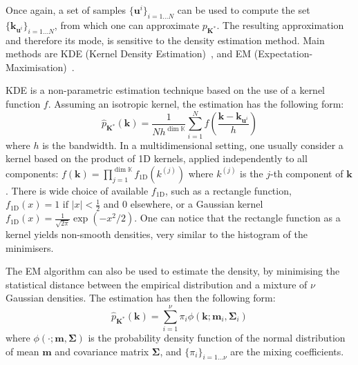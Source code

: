 \documentclass[preprint, 1p]{elsarticle}
\newcommand{\Kspace}{\mathbb{K}}
\newcommand{\elise}[1]{{\itshape\color{red} ({#1})}}
\begin{document}
Once again, a set of samples  $\{\mathbf{u}^i\}_{i=1\dots N}$ can be used to compute the set $\{\mathbf{k}_{\mathbf{u}^i}\}_{i=1\dots N}$, from which one can 
approximate  $p_{\mathbf{K}^*}$. The resulting approximation and therefore its mode, is sensitive to the density estimation method. Main methods are KDE  (Kernel Density Estimation)~\cite{elise}, and  EM (Expectation-Maximisation)~\citep{dempster_maximum_1977}.


KDE is a non-parametric estimation technique based on the use of a kernel function $f$. Assuming an isotropic kernel, the estimation has the following form:
\begin{equation}
\hat{p}_{\mathbf{K}^*}(\mathbf{k}) = \frac{1}{Nh^{\dim \Kspace}} \sum_{i=1}^N f\left(\frac{\mathbf{k} - \mathbf{k}_{\mathbf{u}^i}}{h}\right)
\end{equation}
where $h$ is the bandwidth. In a multidimensional setting, one usually consider a kernel based on the product of 1D kernels, applied independently to all components: $f(\mathbf{k}) = \prod_{j=1}^{\dim \Kspace} f_{\mathrm{1D}} (k^{(j)})$
where $k^{(j)}$ is the $j$-th component of $\mathbf{k}$. There is wide choice of available $f_{\mathrm{1D}}$, such as a rectangle function, $f_{\mathrm{1D}}(x) = 1 \text{ if } |x|< \frac{1}{2}$ and  $0$ elsewhere, or a Gaussian kernel $f_{\mathrm{1D}}(x)= \frac{1}{\sqrt{2\pi}}\exp(-x^2 / 2)$. One can notice that the rectangle function as a kernel yields non-smooth densities, very similar to the histogram of the minimisers.

The EM algorithm can also be used to estimate the density, by minimising the statistical distance between the empirical distribution and a mixture of $\nu$ Gaussian densities. The estimation has then the following form:
\begin{equation}
\hat{p}_{\mathbf{K}^*}(\mathbf{k}) = \sum_{i=1}^{\nu} \pi_i \phi(\mathbf{k}; \mathbf{m}_i, \mathbf{\Sigma}_i)
\end{equation}
where $\phi( \cdot; \mathbf{m}, \mathbf{\Sigma})$ is the probability density function of the normal distribution of mean $\mathbf{m}$ and covariance matrix $\mathbf{\Sigma}$, and $\{\pi_i \}_{i=1 \dots \nu}$ are the mixing coefficients.

\end{document}
